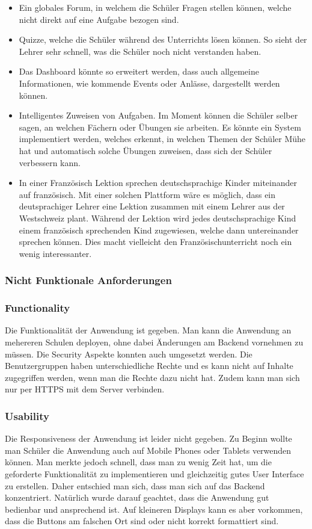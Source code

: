 \begin{itemize}
	\item Ein globales Forum, in welchem die Schüler Fragen stellen können, welche nicht direkt auf eine Aufgabe bezogen sind.
	\item Quizze, welche die Schüler während des Unterrichts lösen können. So sieht der Lehrer sehr schnell, was die Schüler noch nicht verstanden haben.
	\item Das Dashboard könnte so erweitert werden, dass auch allgemeine Informationen, wie kommende Events oder Anlässe, dargestellt werden können.
	\item Intelligentes Zuweisen von Aufgaben. Im Moment können die Schüler selber sagen, an welchen Fächern oder Übungen sie arbeiten. Es könnte ein System implementiert werden, welches erkennt, in welchen Themen der Schüler Mühe hat und automatisch solche Übungen zuweisen, dass sich der Schüler verbessern kann.
	\item In einer Französisch Lektion sprechen deutschsprachige Kinder miteinander auf französisch.	Mit einer solchen Plattform wäre es möglich, dass ein deutsprachiger Lehrer eine Lektion zusammen mit einem Lehrer aus der Westschweiz plant. Während der Lektion wird jedes deutschsprachige Kind einem französisch sprechenden Kind zugewiesen, welche dann untereinander sprechen können. Dies macht vielleicht den Französischunterricht noch ein wenig interessanter.
\end{itemize}


\subsubsection{Nicht Funktionale Anforderungen}

\subsubsection*{Functionality}
Die Funktionalität der Anwendung ist gegeben. Man kann die Anwendung an mehereren Schulen deployen, ohne dabei Änderungen am Backend vornehmen zu müssen. Die Security Aspekte konnten auch umgesetzt werden. Die Benutzergruppen haben unterschiedliche Rechte und es kann nicht auf Inhalte zugegriffen werden, wenn man die Rechte dazu nicht hat. Zudem kann man sich nur per HTTPS mit dem Server verbinden.

\subsubsection*{Usability}
Die Responsiveness der Anwendung ist leider nicht gegeben. Zu Beginn wollte man Schüler die Anwendung auch auf Mobile Phones oder Tablets verwenden können. Man merkte jedoch schnell, dass man zu wenig Zeit hat, um die geforderte Funktionalität zu implementieren und gleichzeitig gutes User Interface zu erstellen. Daher entschied man sich, dass man sich auf das Backend konzentriert. Natürlich wurde darauf geachtet, dass die Anwendung gut bedienbar und ansprechend ist. Auf kleineren Displays kann es aber vorkommen, dass die Buttons am falschen Ort sind oder nicht korrekt formattiert sind.


